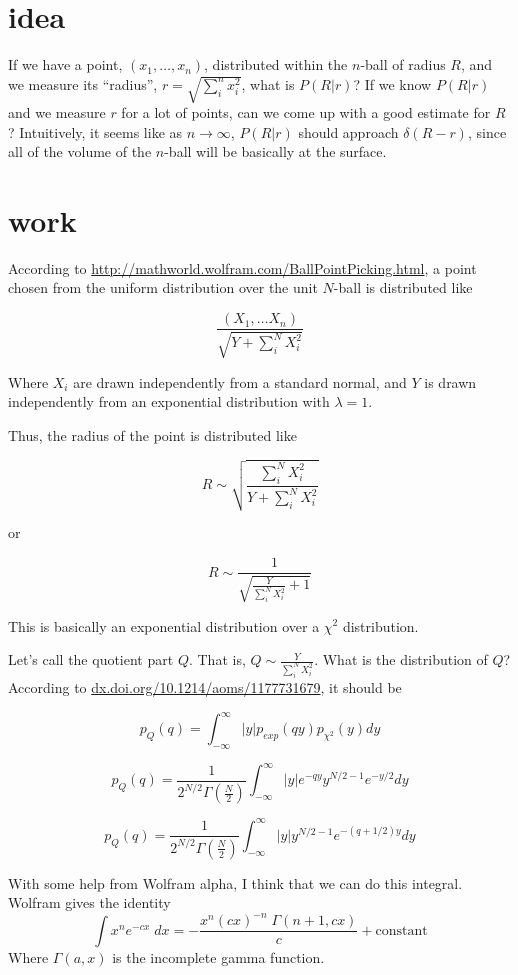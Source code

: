 \documentclass{article}
\begin{document}
\section*{idea}    
If we have a point, $(x_1, \ldots, x_n)$, distributed within the $n$-ball of radius $R$, and we measure its ``radius'', $r = \sqrt{\sum_i^n x_i^2}$,
what is $P(R|r)$? If we know $P(R|r)$ and we measure $r$ for a lot of points,
can we come up with a good estimate for $R$? Intuitively, it seems like as $n\rightarrow\infty$, $P(R|r)$ should approach $\delta(R-r)$, since all of the
volume of the $n$-ball will be basically at the surface.

\section*{work}

According to \url{http://mathworld.wolfram.com/BallPointPicking.html}, a point
chosen from the uniform distribution over the unit $N$-ball is distributed like

$$
\frac{(X_1, \ldots X_n)}{\sqrt{Y + \sum_i^N X_i^2}}
$$

Where $X_i$ are drawn independently from a standard normal, and $Y$ is drawn independently from an exponential distribution with $\lambda=1$.

Thus, the radius of the point is distributed like

$$
R \sim \sqrt{\frac{\sum_i^N X_i^2}{Y  + \sum_i^N X_i^2}}
$$

or 

$$
R \sim \frac{1}{\sqrt{\frac{Y}{\sum_i^N X_i^2} + 1}}
$$

This is basically an exponential distribution over a $\chi^2$ distribution.

Let's call the quotient part $Q$. That is, $Q \sim \frac{Y}{\sum_i^N X_i^2}$. What is the distribution of $Q$? According to \url{dx.doi.org/10.1214/aoms/1177731679}, it should be

$$
p_Q(q) = \int_{-\infty}^\infty |y| p_{exp}(qy)p_{\chi^2}(y)dy
$$

$$
p_Q(q) = \frac{1}{2^{N/2} \Gamma(\frac{N}{2})} \int_{-\infty}^\infty |y| e^{-qy} y^{N/2-1}e^{-y/2}dy
$$


$$
p_Q(q) = \frac{1}{2^{N/2} \Gamma(\frac{N}{2})} \int_{-\infty}^\infty |y|  y^{N/2-1}e^{-(q + 1/2) y}dy
$$

With some help from Wolfram alpha, I think that we can do this integral. 
Wolfram gives the identity
$$
\int x^n e^{-cx} \; dx = -\frac{x^n (cx)^{-n} \; \Gamma(n + 1, cx)}{c} + \text{constant}
$$
Where $\Gamma(a, x)$ is the incomplete gamma function.
\end{document}
